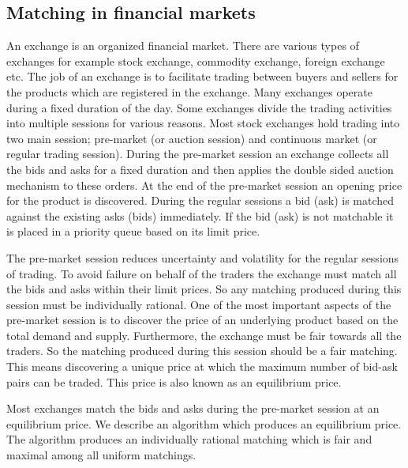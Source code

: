 \documentclass[a4paper,UKenglish,cleveref, autoref]{lipics-v2019}
\begin{document}
\begin{theorem}
\end{theorem}


\subsection{Matching in financial markets}\label{sec:matchingInMarkets} 
An exchange is an organized financial market. There are various types of exchanges for example stock exchange, commodity exchange, foreign exchange etc. The job of an exchange is to facilitate trading between buyers and sellers for the products which are registered in the exchange. Many exchanges operate during a fixed duration of the day. Some exchanges divide the trading activities into multiple sessions for various reasons. Most stock exchanges hold trading into two main session; pre-market (or auction session) and continuous  market (or regular trading session). During the pre-market session an exchange collects all the bids and asks for a fixed duration and then applies the double sided auction mechanism to these orders. At the end of the pre-market session an opening price for the product is discovered. During the regular sessions a bid (ask) is matched against the existing asks (bids) immediately. If the bid (ask) is not matchable it is placed in a priority queue based on its limit price. 

The pre-market session reduces uncertainty and volatility for the regular sessions of trading. To avoid failure on behalf of the traders the exchange must match all the bids and asks within their limit prices. So any matching produced during this session must be individually rational. One of the most important aspects of the pre-market session is to discover the price of an underlying product based on the total demand and supply. Furthermore, the exchange must be fair towards all the traders. So the matching produced during this session should be a fair matching.  This means discovering  a unique price at which the maximum number of  bid-ask pairs can be traded. This price is also known as an equilibrium price. 

Most exchanges match the bids and asks during the pre-market session at an equilibrium price.   We describe an algorithm which produces an equilibrium price. The algorithm  produces an individually rational matching which is fair and maximal among all uniform matchings.
\end{document}
